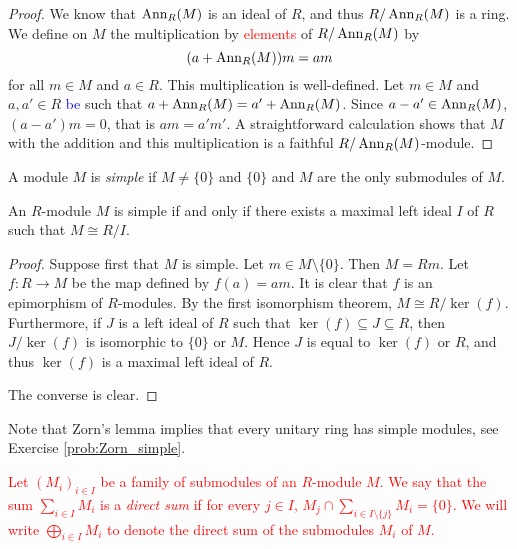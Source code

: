 \begin{proof}
We know that $\operatorname{Ann}_R(M)$ is an ideal of $R$, and thus $R/\operatorname{Ann}_R(M)$ is a ring. 
We define on $M$ the multiplication by \textcolor{red}{elements} of $R/\operatorname{Ann}_R(M)$ by
\[
(a+\operatorname{Ann}_R(M))m=am
\]
for all $m\in M$ and $a\in R$. This multiplication is well-defined.
Let $m\in M$ and $a,a'\in R$ \textcolor{blue}{be} such that $a+\operatorname{Ann}_R(M)=a'+\operatorname{Ann}_R(M)$.
Since $a-a'\in \operatorname{Ann}_R(M)$, 
$(a-a')m=0$, that is $am=a'm'$. 
A straightforward calculation shows that $M$ 
with the addition and this multiplication is a faithful $R/\operatorname{Ann}_R(M)$-module.
\end{proof}

\begin{definition}
A module $M$ is \emph{simple} if $M\neq \{0\}$ and $\{0\}$ and $M$ are the only submodules of $M$.
\end{definition}

\begin{lemma}
\label{Lema 1.1.2}
An $R$-module $M$ is simple if and only if there exists a maximal left ideal $I$ of $R$ such that
$M\cong R/I$.
\end{lemma}

\begin{proof}
Suppose first that $M$ is simple. Let  $m\in M\setminus\{ 0\}$. Then $M=Rm$.
Let $f\colon R\rightarrow M$ be the map defined by $f(a)=am$. 
It is clear that $f$ is an epimorphism of $R$-modules. 
By the first isomorphism theorem, 
$M\cong R/\ker(f)$. 
Furthermore, if $J$ is a left ideal of
$R$ such that $\ker(f)\subseteq J\subseteq R$, then
$J/\ker(f)$ is isomorphic to $\{0\}$ or $M$. Hence $J$ is equal to
$\ker(f)$ or $R$, and thus $\ker(f)$ is a maximal left ideal of $R$.

The converse is clear. 
\end{proof}

Note that Zorn's lemma implies that every unitary ring has simple modules, see Exercise \ref{prob:Zorn_simple}. 

\textcolor{red}{
\begin{definition}
Let $(M_i)_{i\in I}$ be a family of submodules of an $R$-module $M$. We say that the sum $\sum_{i\in I}M_i$ is a {\em direct sum} if for every $j\in I$, $M_j\cap\sum_{i\in I\setminus\{ j\}}M_i=\{0\}$. We will write $\bigoplus_{i\in I}M_i$ to denote the direct sum of the submodules $M_i$ of $M$.
\end{definition}}


